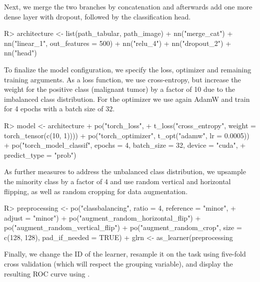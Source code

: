 \documentclass[article]{jss}
\theoremstyle{definition}
\begin{document}
Next, we merge the two branches by concatenation and afterwards add one more dense layer with dropout, followed by the classification head.

\begin{CodeInput}
R> architecture <- list(path_tabular, path_image) %
+    nn("merge_cat") %
+    nn("linear_1", out_features = 500) %
+    nn("relu_4") %
+    nn("dropout_2") %
+    nn("head")
\end{CodeInput}

To finalize the model configuration, we specify the loss, optimizer and remaining training arguments.
As a loss function, we use cross-entropy, but increase the weight for the positive class (malignant tumor) by a factor of 10 due to the imbalanced class distribution.
For the optimizer we use again AdamW and train for 4 epochs with a batch size of $32$.

\begin{CodeInput}
R> model <- architecture %
+    po("torch_loss",
+      t_loss("cross_entropy", weight = torch_tensor(c(10, 1)))) %
+    po("torch_optimizer", t_opt("adamw", lr = 0.0005)) %
+    po("torch_model_classif", epochs = 4, batch_size = 32, device = "cuda",
+      predict_type = "prob")
\end{CodeInput}

As further measures to address the unbalanced class distribution, we upsample the minority class by a factor of 4 and use random vertical and horizontal flipping, as well as random cropping for data augmentation.

\begin{CodeInput}
R> preprocessing <- po("classbalancing", ratio = 4, reference = "minor",
+      adjust = "minor") %
+    po("augment_random_horizontal_flip") %
+    po("augment_random_vertical_flip") %
+    po("augment_random_crop", size = c(128, 128), pad_if_needed = TRUE)
+  glrn <- as_learner(preprocessing %
\end{CodeInput}

Finally, we change the ID of the learner, resample it on the task using five-fold cross validation (which will respect the grouping variable), and display the resulting ROC curve using  \citep{ref-mlr3viz2025}.

\end{document}

